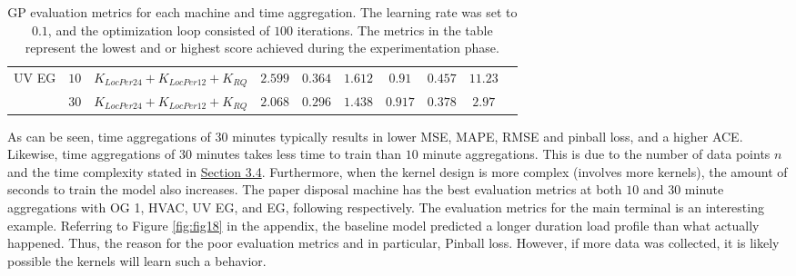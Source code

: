 \begin{table}[htbp]
{\begin{tabular}{lccccccccc}
    UV EG 
     & $10$ & $K_{LocPer24} + K_{LocPer12} + K_{RQ}$ & $2.599$ & $0.364$ & $1.612$ & $0.91$ & $0.457$ & $11.23$ \\
     & $30$ & $K_{LocPer24} + K_{LocPer12} + K_{RQ}$ & $2.068$ & $0.296$ & $1.438$ & $0.917$ & $0.378$ & $2.97$ \\
     
    \hline
    \end{tabular}}
    \caption{GP evaluation metrics for each machine and time aggregation. The learning rate was set to $0.1$, and the optimization loop consisted of $100$ iterations. The metrics in the table represent the lowest and or highest score achieved during the experimentation phase.}
    \label{tab:tab3}
\end{table}

As can be seen, time aggregations of $30$ minutes typically results in lower MSE, MAPE, RMSE and pinball loss, and a higher ACE. Likewise, time aggregations of $30$ minutes takes less time to train than $10$ minute aggregations. This is due to the number of data points $n$ and the time complexity stated in \hyperlink{subsection.3.4}{Section 3.4}. Furthermore, when the kernel design is more complex (involves more kernels), the amount of seconds to train the model also increases. The paper disposal machine has the best evaluation metrics at both $10$ and $30$ minute aggregations with OG 1, HVAC, UV EG, and EG, following respectively. The evaluation metrics for the main terminal is an interesting example. Referring to Figure \ref{fig:fig18} in the appendix, the baseline model predicted a longer duration load profile than what actually happened. Thus, the reason for the poor evaluation metrics and in particular, Pinball loss. However, if more data was collected, it is likely possible the kernels will learn such a behavior.